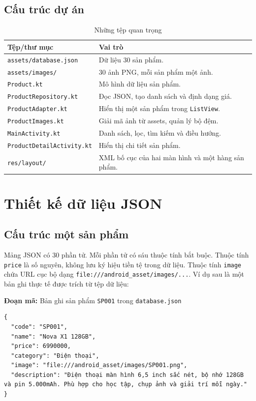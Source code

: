 \documentclass[12pt,a4paper]{article}
\newcommand{\codepath}[1]{\nolinkurl{#1}}
\newcommand{\codecaption}[1]{\par\noindent\textbf{Đoạn mã:} #1\par\vspace{3pt}}
\begin{document}
\subsection{Cấu trúc dự án}
\begin{table}[H]
\centering
\caption{Những tệp quan trọng}
\small
\begin{tabularx}{\textwidth}{@{}p{6.1cm}X@{}}
\toprule
\textbf{Tệp/thư mục} & \textbf{Vai trò}\\
\midrule
\codepath{assets/database.json} & Dữ liệu 30 sản phẩm.\\
\codepath{assets/images/} & 30 ảnh PNG, mỗi sản phẩm một ảnh.\\
\codepath{Product.kt} & Mô hình dữ liệu sản phẩm.\\
\codepath{ProductRepository.kt} & Đọc JSON, tạo danh sách và định dạng giá.\\
\codepath{ProductAdapter.kt} & Hiển thị một sản phẩm trong \texttt{ListView}.\\
\codepath{ProductImages.kt} & Giải mã ảnh từ assets, quản lý bộ đệm.\\
\codepath{MainActivity.kt} & Danh sách, lọc, tìm kiếm và điều hướng.\\
\codepath{ProductDetailActivity.kt} & Hiển thị chi tiết sản phẩm.\\
\codepath{res/layout/} & XML bố cục của hai màn hình và một hàng sản phẩm.\\
\bottomrule
\end{tabularx}
\end{table}

\section{Thiết kế dữ liệu JSON}
\subsection{Cấu trúc một sản phẩm}
Mảng JSON có 30 phần tử. Mỗi phần tử có sáu thuộc tính bắt buộc. Thuộc tính
\texttt{price} là số nguyên, không lưu ký hiệu tiền tệ trong dữ liệu. Thuộc tính
\texttt{image} chứa URL cục bộ dạng \texttt{file:///android\_asset/images/...}.
Ví dụ sau là một bản ghi thực tế được trích từ tệp dữ liệu:
\codecaption{Bản ghi sản phẩm \texttt{SP001} trong \codepath{database.json}}
\begin{Verbatim}[fontsize=\small,breaklines=true,frame=single]
{
  "code": "SP001",
  "name": "Nova X1 128GB",
  "price": 6990000,
  "category": "Điện thoại",
  "image": "file:///android_asset/images/SP001.png",
  "description": "Điện thoại màn hình 6,5 inch sắc nét, bộ nhớ 128GB và pin 5.000mAh. Phù hợp cho học tập, chụp ảnh và giải trí mỗi ngày."
}
\end{Verbatim}
\end{document}
